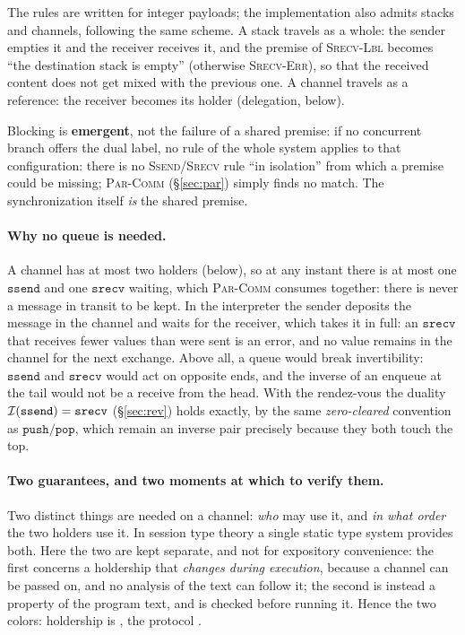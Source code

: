 \medskip
\noindent
The rules are written for integer payloads; the implementation also admits
stacks and channels, following the same scheme. A stack travels as a whole: the
sender empties it and the receiver receives it, and the premise of
\textsc{Srecv-Lbl} becomes ``the destination stack is empty'' (otherwise
\textsc{Srecv-Err}), so that the received content does not get mixed with the
previous one. A channel travels as a reference: the receiver becomes its
holder (delegation, below).

\medskip
\noindent
Blocking is \textbf{emergent}, not the failure of a
shared premise: if no concurrent branch offers the dual label, no
rule of the whole system applies to that configuration: there is no
\textsc{Ssend}/\textsc{Srecv} rule ``in isolation'' from which a premise
could be missing; \textsc{Par-Comm} (\S\ref{sec:par}) simply finds
no match. The synchronization itself \emph{is} the shared premise.

\paragraph{Why no queue is needed.} A channel has at most two holders
(below), so at any instant there is at most one $\mathtt{ssend}$ and one
$\mathtt{srecv}$ waiting, which \textsc{Par-Comm} consumes together: there is never
a message in transit to be kept. In the interpreter the sender deposits the
message in the channel and waits for the receiver, which takes it in full: an
$\mathtt{srecv}$ that receives fewer values than were sent is an
error, and no value remains in the channel for the next exchange. Above all, a queue would break
invertibility: $\mathtt{ssend}$ and $\mathtt{srecv}$ would act on opposite
ends, and the inverse of an enqueue at the tail would not be a receive from the
head. With the rendez-vous the duality $\mathcal{I}(\mathtt{ssend}) = \mathtt{srecv}$
(\S\ref{sec:rev}) holds exactly, by the same
\emph{zero-cleared} convention as $\mathtt{push}/\mathtt{pop}$, which remain an
inverse pair precisely because they both touch the top.

\paragraph{Two guarantees, and two moments at which to verify them.} Two distinct
things are needed on a channel: \emph{who} may use it, and \emph{in what order} the two holders
use it. In session type theory a single static type system provides both.
Here the two are kept separate, and not for expository convenience: the
first concerns a holdership that \emph{changes during execution}, because a
channel can be passed on, and no analysis of the text can follow it; the second
is instead a property of the program text, and is checked before running it.
Hence the two colors: holdership is , the
protocol .


